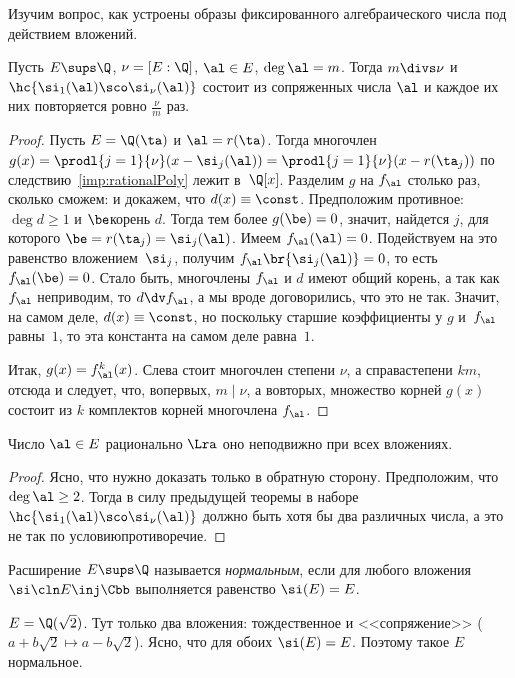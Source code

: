 \documentclass[a4paper]{article}
\begin{document}
Изучим вопрос, как устроены образы фиксированного алгебраического числа под действием вложений.
\begin{theorem}\label{thm:algImage}
Пусть $E \sups \Q$, $\nu=[E:\Q]$, $\al\in E$, $\deg\al=m$. Тогда $m\divs\nu$ и
$\hc{\si_1(\al)\sco \si_\nu(\al)}$ состоит из сопряженных числа $\al$ и каждое их них повторяется ровно
$\frac{\nu}{m}$ раз.
\end{theorem}
\begin{proof}
Пусть $E=\Q(\ta)$ и $\al=r(\ta)$. Тогда многочлен
$g(x)=\prodl{j=1}{\nu}(x-\si_j(\al))=\prodl{j=1}{\nu}(x-r(\ta_j))$ по следствию~\ref{imp:rationalPoly} лежит в~$\Q[x]$.
Разделим $g$ на $f_{\al}$ столько раз, сколько сможем:
и докажем, что $d(x)\equiv \const$. Предположим противное: $\deg d\ge1$ и $\be$\т корень $d$.
Тогда тем более $g(\be) = 0$, значит, найдется $j$, для которого $\be=r(\ta_j)=\si_j(\al)$.
Имеем $f_{\al}(\al)=0$. Подействуем на это равенство
вложением~$\si_j$, получим $f_\al\br{\si_j(\al)}=0$, то есть $f_{\al}(\be)=0$.
Стало быть, многочлены $f_{\al}$ и $d$ имеют общий корень, а так как $f_\al$ неприводим, то $d\dv f_\al$,
а мы вроде договорились, что это не так.
Значит, на самом деле, $d(x)\equiv \const$, но поскольку старшие коэффициенты у $g$ и~$f_\al$ равны~$1$,
то эта константа на самом деле равна~$1$.

Итак, $g(x)= f_{\al}^k(x)$. Слева стоит многочлен степени $\nu$, а справа\т степени
$km$, отсюда и следует, что, во\д первых, $m\mid \nu$, а во\д вторых, множество корней $g(x)$ состоит из
$k$ комплектов корней многочлена $f_{\al}$.
\end{proof}

\begin{imp}
Число $\al\in E$ рационально $\Lra$ оно неподвижно при всех вложениях.
\end{imp}
\begin{proof}
Ясно, что нужно доказать только в обратную сторону. Предположим, что $\deg\al\ge2$. Тогда в силу предыдущей теоремы
в наборе $\hc{\si_1(\al)\sco \si_\nu(\al)}$ должно быть хотя бы два различных числа, а это не
так по условию\т противоречие.
\end{proof}

\begin{df}
Расширение $E\sups\Q$ называется \emph{нормальным}, если для любого вложения $\si\cln E\inj\Cbb$
выполняется равенство $\si(E)=E$.
\end{df}

\begin{ex}
$E=\Q(\sqrt{2})$. Тут только два вложения: тождественное и <<сопряжение>> ($a+b\sqrt{2}\mapsto
a-b\sqrt{2}$). Ясно, что для обоих $\si(E)=E$. Поэтому такое $E$\т  нормальное.
\end{ex}
\end{document}
